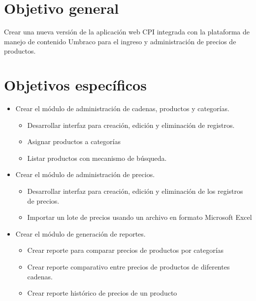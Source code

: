 \section*{Objetivo general}
Crear una nueva versión de la aplicación web CPI integrada con la plataforma de manejo de contenido Umbraco para el ingreso y administración de precios de productos.
\section*{Objetivos específicos}
\begin{itemize}
   \item Crear el módulo de administración de cadenas, productos y categorías.
   \begin{itemize}
       \item Desarrollar interfaz para creación, edición y eliminación de registros.
       \item Asignar productos a categorías
       \item Listar productos con mecanismo de búsqueda.
   \end{itemize}

   \item Crear el módulo de administración de precios.
   \begin{itemize}
       \item Desarrollar interfaz para creación, edición y eliminación de los registros de precios.
       \item Importar un lote de precios usando un archivo en formato Microsoft Excel
   \end{itemize}

   \item Crear el módulo de generación de reportes.
   \begin{itemize}
       \item Crear reporte para comparar precios de productos por categorías
       \item Crear reporte comparativo entre precios de productos de diferentes cadenas.
       \item Crear reporte histórico de precios de un producto
   \end{itemize}
\end{itemize}
